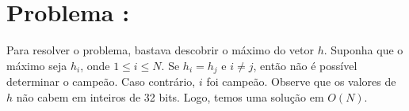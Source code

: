 \section*{Problema \proxLetra: }

Para resolver o problema, bastava descobrir o máximo do vetor $h$. Suponha que o máximo seja $h_i$, onde $1 \leq i \leq N$. Se $h_i = h_j$ e $i \neq j$, então não é possível determinar o campeão. Caso contrário, $i$ foi campeão. Observe que os valores de $h$ não cabem em inteiros de 32 bits. Logo, temos uma solução em $O(N)$.


